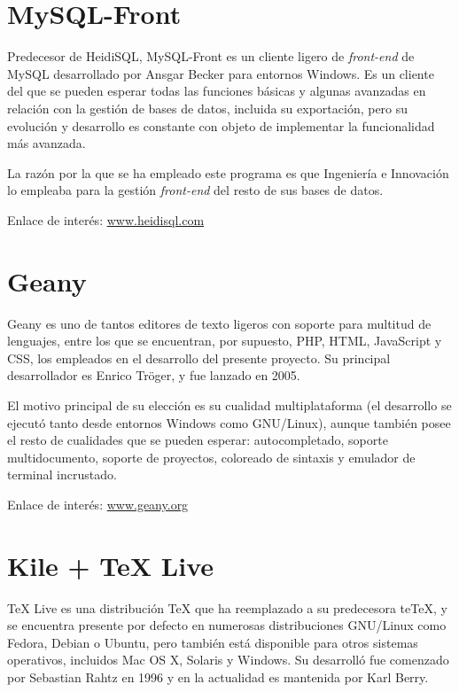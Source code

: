 \section*{MySQL-Front}

Predecesor de HeidiSQL, MySQL-Front es un cliente ligero de \textit{front-end}
de MySQL desarrollado por Ansgar Becker para entornos Windows. Es un cliente del
que se pueden esperar todas las funciones básicas y algunas avanzadas en
relación con la gestión de bases de datos, incluida su exportación, pero su
evolución y desarrollo es constante con objeto de implementar la funcionalidad
más avanzada.

La razón por la que se ha empleado este programa es que Ingeniería e Innovación
lo empleaba para la gestión \textit{front-end} del resto de sus bases de datos.

Enlace de interés: \href{http://www.heidisql.com/}{www.heidisql.com}

\section*{Geany}

Geany es uno de tantos editores de texto ligeros con soporte para multitud de
lenguajes, entre los que se encuentran, por supuesto, PHP, HTML, JavaScript y
CSS, los empleados en el desarrollo del presente proyecto. Su principal
desarrollador es Enrico Tröger, y fue lanzado en 2005.

El motivo principal de su elección es su cualidad multiplataforma (el
desarrollo se ejecutó tanto desde entornos Windows como GNU/Linux), aunque
también posee el resto de cualidades que se pueden esperar: autocompletado,
soporte multidocumento, soporte de proyectos, coloreado de sintaxis y emulador
de terminal incrustado.

Enlace de interés: \href{http://www.geany.org/}{www.geany.org}

\section*{Kile + TeX Live}

TeX Live es una distribución TeX que ha reemplazado a su predecesora teTeX, y
se encuentra presente por defecto en numerosas distribuciones GNU/Linux como
Fedora, Debian o Ubuntu, pero también está disponible para otros sistemas
operativos, incluidos Mac OS X, Solaris y Windows. Su desarrolló fue comenzado
por Sebastian Rahtz en 1996 y en la actualidad es mantenida por Karl Berry.

